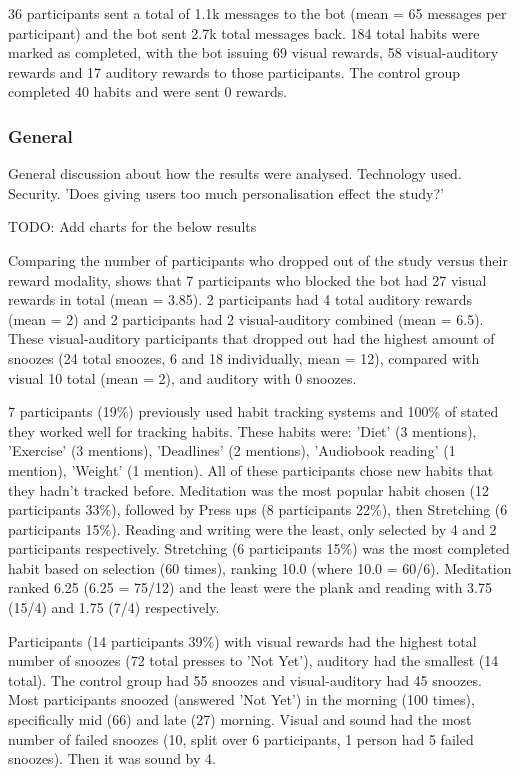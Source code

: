 36 participants sent a total of 1.1k messages to the bot (mean = 65 messages per participant) and the bot sent 2.7k total messages back. 184 total habits were marked as completed, with the bot issuing 69 visual rewards, 58 visual-auditory rewards and 17 auditory rewards to those participants. The control group completed 40 habits and were sent 0 rewards.


\subsubsection*{General}
General discussion about how the results were analysed. Technology used. Security.\newline
'Does giving users too much personalisation effect the study?'\newline

TODO: Add charts for the below results

Comparing the number of participants who dropped out of the study versus their reward modality, shows that 7 participants who blocked the bot had 27 visual rewards in total (mean = 3.85). 2 participants had 4 total auditory rewards (mean = 2) and 2 participants had 2 visual-auditory combined (mean = 6.5). These visual-auditory participants that dropped out had the highest amount of snoozes (24 total snoozes, 6 and 18 individually, mean = 12), compared with visual 10 total (mean = 2), and auditory with 0 snoozes.

7 participants (19\%) previously used habit tracking systems and 100\% of stated they worked well for tracking habits. These habits were: 'Diet' (3 mentions), 'Exercise' (3 mentions), 'Deadlines' (2 mentions), 'Audiobook reading' (1 mention), 'Weight' (1 mention). All of these participants chose new habits that they hadn't tracked before. Meditation was the most popular habit chosen (12 participants 33\%), followed by Press ups (8 participants 22\%), then Stretching (6 participants 15\%). Reading and writing were the least, only selected by 4 and 2 participants respectively. Stretching (6 participants 15\%) was the most completed habit based on selection (60 times), ranking 10.0 (where 10.0 = 60/6). Meditation ranked 6.25 (6.25 = 75/12) and the least were the plank and reading with 3.75 (15/4) and 1.75 (7/4) respectively.

Participants (14 participants 39\%) with visual rewards had the highest total number of snoozes (72 total presses to 'Not Yet'), auditory had the smallest (14 total). The control group had 55 snoozes and visual-auditory had 45 snoozes. Most participants snoozed (answered 'Not Yet') in the morning (100 times), specifically mid (66) and late (27) morning. Visual and sound had the most number of failed snoozes (10, split over 6 participants, 1 person had 5 failed snoozes). Then it was sound by 4.

